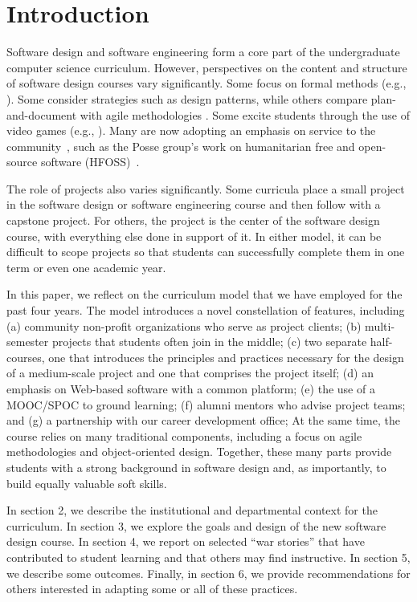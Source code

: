 
\section{Introduction}

Software design and software engineering form a core part of
the undergraduate computer science curriculum. However, perspectives
on the content and structure of software design courses vary
significantly.  Some focus on formal methods (e.g., 
\cite{garcia-2014,liu-2009}).  Some consider strategies such as design
patterns, while others compare plan-and-document with agile
methodologies \cite{gestwicki-2018}.  Some excite students through
the use of video games (e.g., \cite{wolz-2007,sweedyk-2005,sweedyk-2011}).  
Many are
now adopting an emphasis on service to the community~\cite{hfoss-2018,buckley-2004,liu-2005,leidig-2006,lange-2011},
such as the Posse group's work on humanitarian free and open-source
software (HFOSS)~\cite{posse-2018}.

The role of projects also varies significantly.  Some curricula
place a small project in the software design or software engineering
course and then follow with a capstone project.  For others, the
project is the center of the software design course, with everything
else done in support of it. In either model, it can be difficult
to scope projects so that students can successfully complete them
in one term or even one academic year.

In this paper, we reflect on the curriculum model that we have
employed for the past four years.  The model introduces a novel 
constellation of features, 
including (a) community non-profit organizations who
serve as project clients; (b) multi-semester projects that students
often join in the middle; (c) two separate half-courses, one that
introduces the principles and practices necessary for the design
of a medium-scale project and one that comprises the project itself;
(d) an emphasis on
Web-based software with a common platform; (e) the use of a
MOOC/SPOC to ground learning;  
(f) alumni mentors who advise project teams; and (g) a
partnership with our career development office; 
At the same time, the course relies
on many traditional components, including a focus on agile methodologies
and object-oriented design.  Together, these many parts provide
students with a strong background in software design and, as
importantly, to build equally valuable soft skills.

In section 2, we describe the institutional and
departmental context for the curriculum.  In section 3, we explore
the goals and design of the new software design course.  In
section 4, we report on selected ``war stories'' that have contributed
to student learning and that others may find instructive.
In section 5, we describe some outcomes.  Finally,
in section 6, we provide recommendations for others interested in
adapting some or all of these practices.


